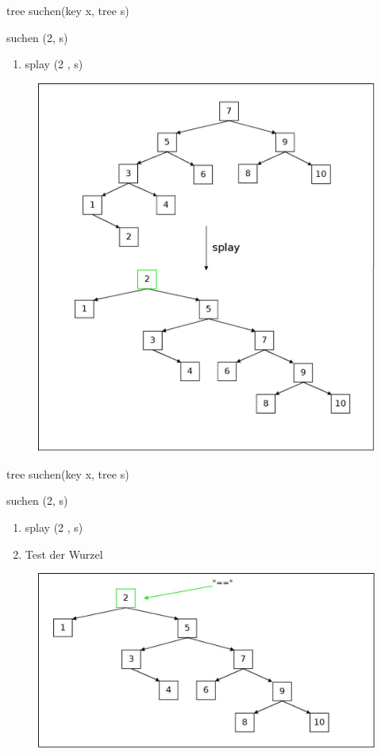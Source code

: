 \documentclass[11pt]{beamer}
\begin{document}
	\begin{frame}{tree suchen(key x, tree s)}
		\begin{block}{suchen (2, s)}
		\begin{enumerate}
			\item splay (2 ,  s)
	
		\end{enumerate}
		\pause
		\end{block}	
		\begin{figure}[h]
			\centering
			\includegraphics[height=0.50\textwidth]{"bilder/suchen"}	
		\end{figure}
		
	\end{frame}	

		\begin{frame}{tree suchen(key x, tree s)}
		\begin{block}{suchen (2, s)}
			\begin{enumerate}
				\item splay (2 ,  s)
				\item Test der Wurzel	
			\end{enumerate}
		\end{block}	
		\begin{figure}[h]
			\centering
			\includegraphics[height=0.50\textwidth]{"bilder/suchen1"}	
		\end{figure}
		
	\end{frame}	
\end{document}
